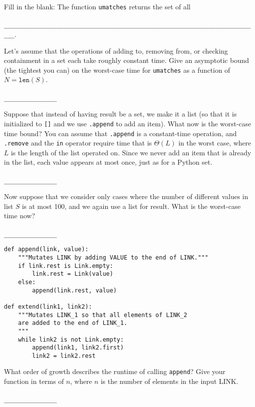 \documentclass[twoside]{article}
\begin{document}
\begin{enumerate}
\begin{enumerate}
Fill in the blank: The function \texttt{umatches} returns the set of all\\\\
\lstinline{_________________________________________________________________________}.

Let's assume that the operations of adding to, removing from, or checking containment in a set each take roughly constant time. Give an asymptotic bound (the tightest you can) on the worst-case time for \texttt{umatches} as a function of $N = \texttt{len}(S)$.
~\\\\
\lstinline{_______________}

Suppose that instead of having result be a set, we make it a list (so that it is initialized to \texttt{[]} and we use \texttt{.append} to add an item). What now is the worst-case time bound? You can assume that \texttt{.append} is a constant-time operation, and \texttt{.remove} and the \texttt{in} operator require time that is $\Theta(L)$ in the worst case, where $L$ is the length of the list operated on. Since we never add an item that is already in the list, each value appears at most once, just as for a Python set.
~\\\\
\lstinline{_______________}

Now suppose that we consider only cases where the number of different values in list $S$ is at most 100, and we again use a list for result. What is the worst-case time now?
~\\\\
\lstinline{_______________}
\end{enumerate}


\begin{lstlisting}
def append(link, value):
    """Mutates LINK by adding VALUE to the end of LINK."""
    if link.rest is Link.empty:
        link.rest = Link(value)
    else:
        append(link.rest, value)

def extend(link1, link2):
    """Mutates LINK_1 so that all elements of LINK_2
    are added to the end of LINK_1.
    """
    while link2 is not Link.empty:
        append(link1, link2.first)
        link2 = link2.rest
\end{lstlisting}

\begin{enumerate}
What order of growth describes the runtime of calling \texttt{append}? Give your function in terms of $n$, where $n$ is the number of elements in the input LINK.
~\\\\
\lstinline{_______________}


\end{enumerate}
\end{enumerate}
\end{document}
